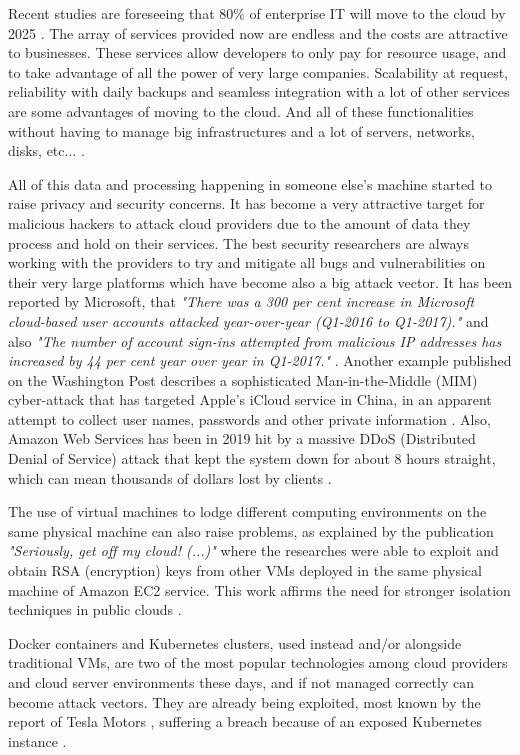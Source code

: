 Recent studies are foreseeing that 80{\%} of enterprise IT will move to the cloud by 2025 \cite{cloud_statistic:1}. The array of services provided now are endless and the costs are attractive to businesses. These services allow developers to only pay for resource usage, and to take advantage of all the power of very large companies. Scalability at request, reliability with daily backups and seamless integration with a lot of other services are some advantages of moving to the cloud. And all of these functionalities without having to manage big infrastructures and a lot of servers, networks, disks, etc... \cite{cloud_benefits:1}.

All of this data and processing happening in someone else's machine started to raise privacy and security concerns. It has become a very attractive target for malicious hackers to attack cloud providers due to the amount of data they process and hold on their services. The best security researchers are always working with the providers to try and mitigate all bugs and vulnerabilities on their very large platforms which have become also a big attack vector. It has been reported by Microsoft, that \textit{"There was a 300 per cent increase in Microsoft cloud-based user accounts attacked year-over-year (Q1-2016 to Q1-2017)."} and also \textit{"The number of account sign-ins attempted from malicious IP addresses has increased by 44 per cent year over year in Q1-2017."} \cite{cloud_attacks:1}. Another example published on the Washington Post describes a sophisticated Man-in-the-Middle (\gls{MIM}) cyber-attack that has targeted Apple’s iCloud service in China, in an apparent attempt to collect user names, passwords and other private information \cite{cloud_attacks:2}. Also, Amazon Web Services has been in 2019 hit by a massive \gls{DDoS} (Distributed Denial of Service) attack that kept the system down for about 8 hours straight, which can mean thousands of dollars lost by clients \cite{cloud_attacks:3}.

The use of virtual machines to lodge different computing environments on the same physical machine can also raise problems, as explained by the publication \textit{"Seriously, get off my cloud! (...)"} where the researches were able to exploit and obtain \gls{RSA} (encryption) keys from other \glspl{VM} deployed in the same physical machine of Amazon EC2 service. This work affirms the need for stronger isolation techniques in public clouds \cite{cryptoeprint:2015:898}.

Docker containers and Kubernetes clusters, used instead and/or alongside traditional \glspl{VM}, are two of the most popular technologies among cloud providers and cloud server environments these days, and if not managed correctly can become attack vectors. They are already being exploited, most known by the report of Tesla Motors \cite{tesla_leak:1}, suffering a breach because of an exposed Kubernetes instance \cite{docker_leak:1, kubernetes_leak:1}.

